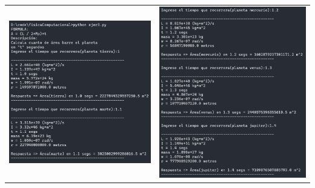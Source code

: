 \documentclass[a4paper,12pt]{article}
\begin{document}
    \begin{table}[!htbp]
        \centering
        \begin{tabular}{cc}
            \begin{minipage}{.3\textwidth}
                \includegraphics[width=\linewidth]{e3_1}
            \end{minipage}&\begin{minipage}{.3\textwidth}
                \includegraphics[width=\linewidth]{e3_2}

\end{minipage}
\end{tabular}
\end{table}
\end{document}
